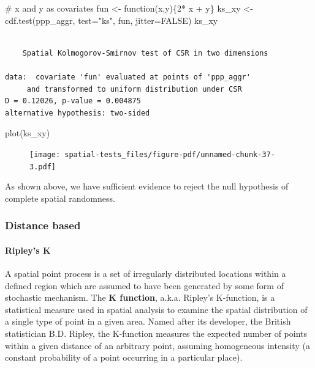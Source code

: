 \documentclass[
  letterpaper,
]{book}
\let\oldparagraph\paragraph
\renewcommand{\paragraph}[1]{\oldparagraph{#1}\mbox{}}
\newenvironment{Shaded}{\begin{snugshade}}{\end{snugshade}}
\newcommand{\AttributeTok}[1]{\textcolor[rgb]{0.40,0.45,0.13}{#1}}
\newcommand{\CommentTok}[1]{\textcolor[rgb]{0.37,0.37,0.37}{#1}}
\newcommand{\ConstantTok}[1]{\textcolor[rgb]{0.56,0.35,0.01}{#1}}
\newcommand{\ControlFlowTok}[1]{\textcolor[rgb]{0.00,0.23,0.31}{#1}}
\newcommand{\DecValTok}[1]{\textcolor[rgb]{0.68,0.00,0.00}{#1}}
\newcommand{\FunctionTok}[1]{\textcolor[rgb]{0.28,0.35,0.67}{#1}}
\newcommand{\NormalTok}[1]{\textcolor[rgb]{0.00,0.23,0.31}{#1}}
\newcommand{\OtherTok}[1]{\textcolor[rgb]{0.00,0.23,0.31}{#1}}
\newcommand{\SpecialCharTok}[1]{\textcolor[rgb]{0.37,0.37,0.37}{#1}}
\newcommand{\StringTok}[1]{\textcolor[rgb]{0.13,0.47,0.30}{#1}}
\begin{document}
\begin{Shaded}
\begin{Highlighting}[]
\CommentTok{\# x and y as covariates}
\NormalTok{fun }\OtherTok{\textless{}{-}} \ControlFlowTok{function}\NormalTok{(x,y)\{}\DecValTok{2}\SpecialCharTok{*}\NormalTok{ x }\SpecialCharTok{+}\NormalTok{ y\}}
\NormalTok{ks\_xy }\OtherTok{\textless{}{-}} \FunctionTok{cdf.test}\NormalTok{(ppp\_aggr, }\AttributeTok{test=}\StringTok{"ks"}\NormalTok{, fun, }\AttributeTok{jitter=}\ConstantTok{FALSE}\NormalTok{)}
\NormalTok{ks\_xy}
\end{Highlighting}
\end{Shaded}

\begin{verbatim}

    Spatial Kolmogorov-Smirnov test of CSR in two dimensions

data:  covariate 'fun' evaluated at points of 'ppp_aggr' 
     and transformed to uniform distribution under CSR
D = 0.12026, p-value = 0.004875
alternative hypothesis: two-sided
\end{verbatim}

\begin{Shaded}
\begin{Highlighting}[]
\FunctionTok{plot}\NormalTok{(ks\_xy)}
\end{Highlighting}
\end{Shaded}

\begin{figure}[H]

\texttt{[image: spatial-tests\_files/figure-pdf/unnamed-chunk-37-3.pdf]} \hfill{}

\end{figure}

As shown above, we have sufficient evidence to reject the null
hypothesis of complete spatial randomness.

\hypertarget{distance-based}{%
\subsubsection{Distance based}\label{distance-based}}

\hypertarget{ripleys-k}{%
\paragraph{Ripley's K}\label{ripleys-k}}

A spatial point process is a set of irregularly distributed locations
within a defined region which are assumed to have been generated by some
form of stochastic mechanism. The \textbf{K function}, a.k.a. Ripley's
K-function, is a statistical measure used in spatial analysis to examine
the spatial distribution of a single type of point in a given area.
Named after its developer, the British statistician B.D. Ripley, the
K-function measures the expected number of points within a given
distance of an arbitrary point, assuming homogeneous intensity (a
constant probability of a point occurring in a particular place).
\end{document}

